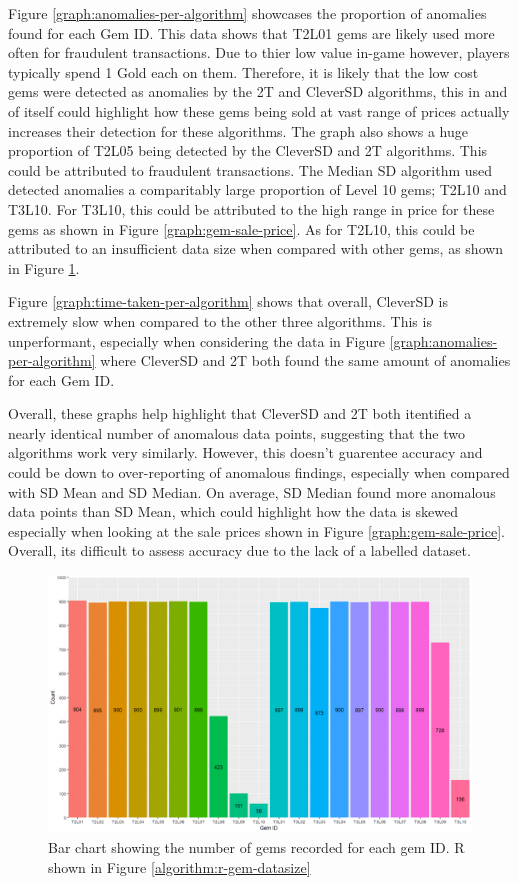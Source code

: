 \documentclass[journal]{IEEEtran}
\begin{document}
Figure \ref{graph:anomalies-per-algorithm} showcases the proportion of anomalies found for each Gem ID. This data shows that T2L01 gems are likely used more often for fraudulent transactions. Due to thier low value in-game however, players typically spend 1 Gold each on them. Therefore, it is likely that the low cost gems were detected as anomalies by the 2T and CleverSD algorithms, this in and of itself could highlight how these gems being sold at vast range of prices actually increases their detection for these algorithms.
The graph also shows a huge proportion of T2L05 being detected by the CleverSD and 2T algorithms. This could be attributed to fraudulent transactions.
The Median SD algorithm used detected anomalies a comparitably large proportion of Level 10 gems; T2L10 and T3L10. For T3L10, this could be attributed to the high range in price for these gems as shown in Figure \ref{graph:gem-sale-price}. As for T2L10, this could be attributed to an insufficient data size when compared with other gems, as shown in Figure \ref{graph:gem-datasize}.

Figure \ref{graph:time-taken-per-algorithm} shows that overall, CleverSD is extremely slow when compared to the other three algorithms. This is unperformant, especially when considering the data in Figure \ref{graph:anomalies-per-algorithm} where CleverSD and 2T both found the same amount of anomalies for each Gem ID.

Overall, these graphs help highlight that CleverSD and 2T both itentified a nearly identical number of anomalous data points, suggesting that the two algorithms work very similarly. However, this doesn't guarentee accuracy and could be down to over-reporting of anomalous findings, especially when compared with SD Mean and SD Median. On average, SD Median found more anomalous data points than SD Mean, which could highlight how the data is skewed especially when looking at the sale prices shown in Figure \ref{graph:gem-sale-price}. Overall, its difficult to assess accuracy due to the lack of a labelled dataset.

\begin{figure}[!htbp]
    \centering
    \includegraphics[width=12cm]{graph-gem-datasize.png}
    \caption{Bar chart showing the number of gems recorded for each gem ID. R shown in Figure \ref{algorithm:r-gem-datasize}}
    \label{graph:gem-datasize}
\end{figure}
\end{document}
